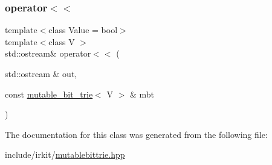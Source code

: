 \subsubsection{\texorpdfstring{operator$<$$<$}{operator<<}}
{\footnotesize\ttfamily template$<$class Value = bool$>$ \\
template$<$class V $>$ \\
std\+::ostream\& operator$<$$<$ (\begin{DoxyParamCaption}\item[{std\+::ostream \&}]{out,  }\item[{const \mbox{\hyperlink{classirk_1_1mutable__bit__trie}{mutable\+\_\+bit\+\_\+trie}}$<$ V $>$ \&}]{mbt }\end{DoxyParamCaption})\hspace{0.3cm}{\ttfamily [friend]}}



The documentation for this class was generated from the following file\+:\begin{DoxyCompactItemize}
\item 
include/irkit/\mbox{\hyperlink{mutablebittrie_8hpp}{mutablebittrie.\+hpp}}\end{DoxyCompactItemize}
